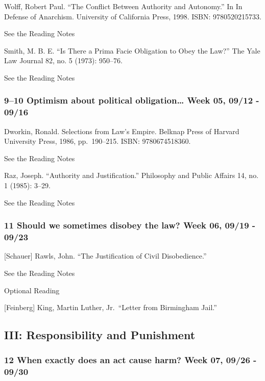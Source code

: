 \documentclass[11pt,]{article}
\begin{document}
Wolff, Robert Paul. ``The Conflict Between Authority and Autonomy.'' In
In Defense of Anarchism. University of California Press, 1998. ISBN:
9780520215733.

See the Reading Notes

Smith, M. B. E. ``Is There a Prima Facie Obligation to Obey the Law?''
The Yale Law Journal 82, no. 5 (1973): 950--76.

See the Reading Notes

\subsubsection{9--10 Optimism about political obligation\ldots{} Week
05, 09/12 -
09/16}\label{optimism-about-political-obligation-week-05-0912---0916}

Dworkin, Ronald. Selections from Law's Empire. Belknap Press of Harvard
University Press, 1986, pp.~190--215. ISBN: 9780674518360.

See the Reading Notes

Raz, Joseph. ``Authority and Justification.'' Philosophy and Public
Affairs 14, no. 1 (1985): 3--29.

See the Reading Notes

\subsubsection{11 Should we sometimes disobey the law? Week 06, 09/19 -
09/23}\label{should-we-sometimes-disobey-the-law-week-06-0919---0923}

{[}Schauer{]} Rawls, John. ``The Justification of Civil Disobedience.''

See the Reading Notes

Optional Reading

{[}Feinberg{]} King, Martin Luther, Jr.~``Letter from Birmingham Jail.''

\subsection{III: Responsibility and
Punishment}\label{iii-responsibility-and-punishment}

\subsubsection{12 When exactly does an act cause harm? Week 07, 09/26 -
09/30}\label{when-exactly-does-an-act-cause-harm-week-07-0926---0930}
\end{document}
